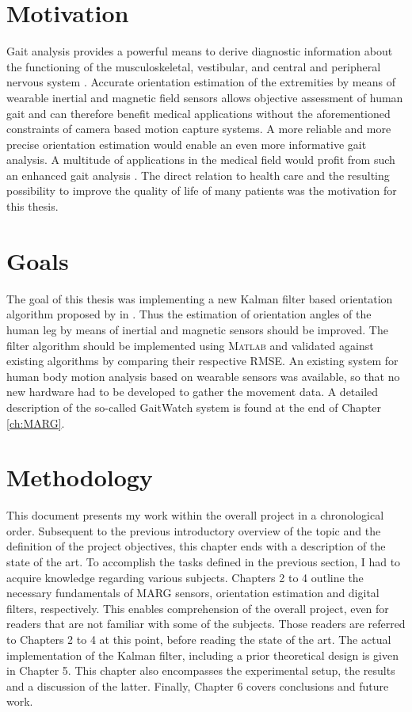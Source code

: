\section{Motivation}

Gait analysis provides a powerful means to derive diagnostic information about the functioning of the musculoskeletal, vestibular, and central and peripheral nervous system \cite{bennett_extended_2013}. Accurate orientation estimation of the extremities by means of wearable inertial and magnetic field sensors allows objective assessment of human gait and can therefore benefit medical applications without the aforementioned constraints of camera based motion capture systems. A more reliable and more precise orientation estimation would enable an even more informative gait analysis. A multitude of applications in the medical field would profit from such an enhanced gait analysis \cite{wong_clinical_2007}. The direct relation to health care and the resulting possibility to improve the quality of life of many patients was the motivation for this thesis.

\section{Goals}

The goal of this thesis was implementing a new Kalman filter based orientation algorithm proposed by \citeauthor{bennett_motion_2014} in \cite{bennett_motion_2014}. Thus the estimation of orientation angles of the human leg by means of inertial and magnetic sensors should be improved. The filter algorithm should be implemented using \textsc{Matlab}\textsuperscript{\textregistered} and validated against existing algorithms by comparing their respective \gls{RMSE}. An existing system for human body motion analysis based on wearable sensors was available, so that no new hardware had to be developed to gather the movement data. A detailed description of the so-called GaitWatch system is found at the end of Chapter \ref{ch:MARG}.

\section{Methodology}

This document presents my work within the overall project in a chronological order. Subsequent to the previous introductory overview of the topic and the definition of the project objectives, this chapter ends with a description of the state of the art. To accomplish the tasks defined in the previous section, I had to acquire knowledge regarding various subjects. Chapters 2 to 4 outline the necessary fundamentals of MARG sensors, orientation estimation and digital filters, respectively.  This enables comprehension of the overall project, even for readers that are not familiar with some of the subjects. Those readers are referred to Chapters 2 to 4 at this point, before reading the state of the art. The actual implementation of the Kalman filter, including a prior theoretical design is given in Chapter 5. This chapter also encompasses the experimental setup, the results and a discussion of the latter. Finally, Chapter 6 covers conclusions and future work.

